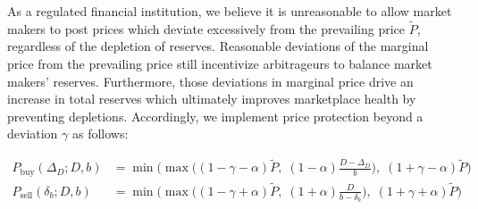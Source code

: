 \documentclass{article}
\begin{document}
As a regulated financial institution, we believe it is unreasonable to allow market makers to post prices which deviate excessively from the prevailing price $\tilde{P}$, regardless of the depletion of reserves. Reasonable deviations of the marginal price from the prevailing price still incentivize arbitrageurs to balance market makers' reserves. Furthermore, those deviations in marginal price drive an increase in total reserves which ultimately improves marketplace health by preventing depletions. Accordingly, we implement price protection beyond a deviation $\gamma$ as follows:

\begin{equation}
\begin{split}
P_{\mathrm{buy}}(\Delta_D; D, b) &= \min \Big( \max \big( (1 - \gamma - \alpha)\tilde{P}, \; (1 - \alpha) \frac{D - \Delta_D}{b} \big), \; (1 + \gamma - \alpha) \tilde{P} \Big) \\
P_{\mathrm{sell}}(\delta_b; D, b) &= \min \Big( \max \big( (1 - \gamma + \alpha) \tilde{P}, \; (1 + \alpha) \frac{D}{b - \delta_b} \big), \; (1 + \gamma + \alpha)\tilde{P} \Big)
\end{split}
\end{equation}

  
\end{document}
